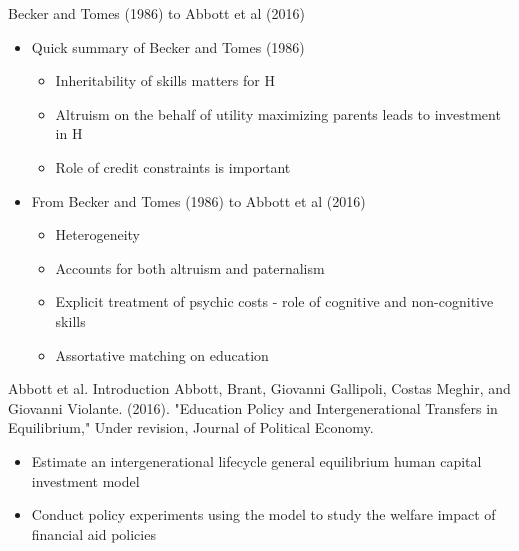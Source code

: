 \documentclass{beamer}
\begin{document}
\begin{frame}{Becker and Tomes (1986) to Abbott et al (2016) }
\begin{itemize}
\item Quick summary of Becker and Tomes (1986)
\begin{itemize}
\item Inheritability of skills matters for H
\item Altruism on the behalf of utility maximizing parents leads to investment in H
\item Role of credit constraints is important
\end{itemize}

\item From Becker and Tomes (1986) to Abbott et al  (2016)
\begin{itemize}
\item Heterogeneity 
\item Accounts for both altruism and paternalism
\item Explicit treatment of psychic costs - role of cognitive and non-cognitive skills
\item Assortative matching on education 
\end{itemize}
\end{itemize} 
\end{frame}


\begin{frame}{Abbott et al. Introduction}
Abbott, Brant, Giovanni Gallipoli, Costas Meghir, and Giovanni Violante. (2016). "Education Policy and Intergenerational Transfers in Equilibrium," Under revision, Journal of Political Economy. \\

\begin{itemize}
\item Estimate an intergenerational lifecycle general equilibrium human capital investment model 
\item Conduct policy experiments using the model to study the welfare impact of financial aid policies
\end{itemize}
\end{frame}
\end{document}
